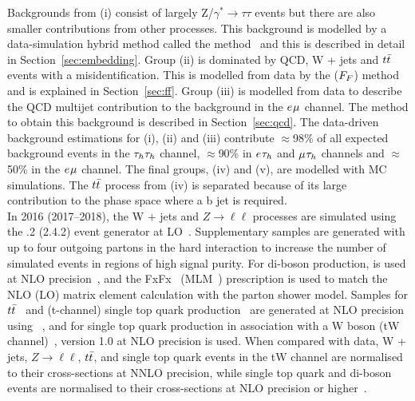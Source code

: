 Backgrounds from (i) consist of largely Z/$\gamma^* \rightarrow \tau\tau$ events but there are also smaller contributions from other processes. 
This background is modelled by a data-simulation hybrid method called the  method~\cite{CMS_embedding} and this is described in detail in Section~\ref{sec:embedding}.
Group (ii) is dominated by \ac{QCD}, W + jets and $t\bar{t}$ events with a \jtth misidentification.
This is modelled from data by the  ($F_{F}$) method~\cite{Sirunyan:2018zut,CMS:2018lkr} and is explained in Section~\ref{sec:ff}.
Group (iii) is modelled from data to describe the \ac{QCD} multijet contribution to the background in the $e_{}\mu_{}$ channel.
The method to obtain this background is described in Section~\ref{sec:qcd}.
The data-driven background estimations for (i), (ii) and (iii) contribute $\approx$98\% of all expected background events in the $\tau_{h}\tau_{h}$ channel, $\approx$90\% in $e_{}\tau_{h}$ and $\mu_{}\tau_{h}$ channels and $\approx$50\% in the $e_{}\mu_{}$ channel.
The final groups, (iv) and (v), are modelled with \ac{MC} simulations.
The $t\bar{t}$ process from (iv) is separated because of its large contribution to the phase space where a b jet is required. \\

In 2016 (2017--2018), the W + jets and $Z\rightarrow \ell\ell$ processes are simulated using the .2 (2.4.2) event generator at \ac{LO}~\cite{Alwall:2011uj}. 
Supplementary samples are generated with up to four outgoing partons in the hard interaction to increase the number of simulated events in regions of high signal purity. 
For di-boson production, \MGvATNLO is used at \ac{NLO} precision~\cite{Alwall:2011uj}, and the FxFx~\cite{Frederix:2012ps} (MLM~\cite{Alwall:2007fs}) prescription is used to match the \ac{NLO} (\ac{LO}) matrix element calculation with the parton shower model. 
Samples for $t\bar{t}$~\cite{Alioli:2011as} and (t-channel) single top quark production~\cite{Frederix:2012dh} are generated at \ac{NLO} precision using ~\cite{Nason:2004rx,Frixione:2007vw,Alioli:2010xd,Jezo:2015aia}, and for single top quark production in association with a W boson (tW channel)~\cite{Re:2010bp}, \POWHEG version 1.0 at \ac{NLO} precision is used. 
When compared with data, W + jets, $Z\rightarrow \ell\ell$, $t\bar{t}$, and single top quark events in the tW channel are normalised to their cross-sections at \ac{NNLO} precision\cite{Melnikov:2006kv,Czakon:2011xx,Kidonakis:2013zqa}, while single top quark and di-boson events are normalised to their cross-sections at \ac{NLO} precision or higher~\cite{Kidonakis:2013zqa,Campbell:2011bn,Gehrmann:2014fva}.

